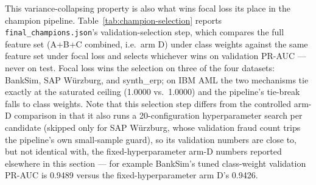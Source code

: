 This variance-collapsing property is also what wins focal loss its place in the champion pipeline. Table~\ref{tab:champion-selection} reports \texttt{final\_champions.json}'s validation-selection step, which compares the full feature set (A+B+C combined, i.e.\ arm D) under class weights against the same feature set under focal loss and selects whichever wins on validation PR-AUC --- never on test. Focal loss wins the selection on three of the four datasets: BankSim, SAP Würzburg, and synth\_erp; on IBM AML the two mechanisms tie exactly at the saturated ceiling (1.0000 vs.\ 1.0000) and the pipeline's tie-break falls to class weights. Note that this selection step differs from the controlled arm-D comparison in that it also runs a 20-configuration hyperparameter search per candidate (skipped only for SAP Würzburg, whose validation fraud count trips the pipeline's own small-sample guard), so its validation numbers are close to, but not identical with, the fixed-hyperparameter arm-D numbers reported elsewhere in this section --- for example BankSim's tuned class-weight validation PR-AUC is 0.9489 versus the fixed-hyperparameter arm D's 0.9426.

\begin{table}[t]
\centering
\caption{Champion validation selection (\texttt{final\_champions.json}), full feature set (topology+TGN+ordinary). Margin = focal $-$ class-weight on validation. $^\ddagger$selection flagged \texttt{reliable=false} (SAP Würzburg's HPO was skipped by the small-sample guard). $^\dagger$synth\_erp is non-evidentiary.}
\label{tab:champion-selection}
\end{table}


